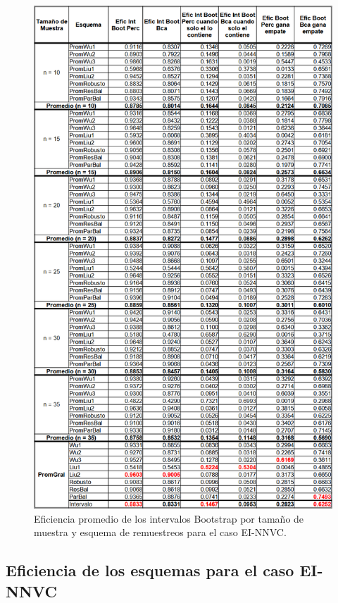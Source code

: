 \begin{figure}[ht] 
	\centering 
	\includegraphics[width=0.75\linewidth]{img/EI_NNVC_Efic_Boots.png} 
	\caption{Eficiencia promedio de los intervalos Bootstrap por tamaño de muestra y esquema de remuestreos para el caso EI-NNVC.} 
	\label{fig:EI_NNVC_Boots}
\end{figure}

\subsection{Eficiencia de los esquemas para el caso EI-NNVC}

